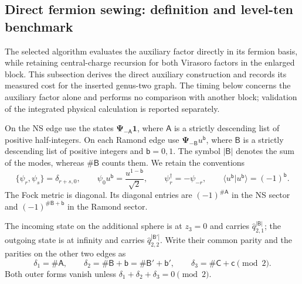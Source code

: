 \subsection{Direct fermion sewing: definition and level-ten benchmark}
\label{direct-fermion-definition}

The selected algorithm evaluates the auxiliary factor directly in its
fermion basis, while retaining central-charge recursion for both
Virasoro factors in the enlarged block.  This subsection derives the
direct auxiliary construction and records its measured cost for the
inserted genus-two graph.  The timing below concerns the auxiliary
factor alone and performs no comparison with another block; validation
of the integrated physical calculation is reported separately.

On the NS edge use the states
$\boldsymbol\Psi_{-\mathsf A}\mathbf1$, where $\mathsf A$ is a
strictly descending list of positive half-integers.  On each Ramond
edge use $\boldsymbol\Psi_{-\mathsf B}u^{\mathsf b}$, where
$\mathsf B$ is a strictly descending list of positive integers and
$\mathsf b=0,1$.  The symbol $|\mathsf B|$ denotes the sum of the
modes, whereas $\#\mathsf B$ counts them.  We retain the conventions
\begin{equation}
 \{\psi_r,\psi_s\}=\delta_{r+s,0},\qquad
 \psi_0u^{\mathsf b}=\frac{u^{1-\mathsf b}}{\sqrt2},\qquad
 \psi_r^\dagger=-\psi_{-r},\qquad
 \langle u^{\mathsf b}|u^{\mathsf b}\rangle=(-1)^{\mathsf b}.
\end{equation}
The Fock metric is diagonal.  Its diagonal entries are
$(-1)^{\#\mathsf A}$ in the NS sector and
$(-1)^{\#\mathsf B+\mathsf b}$ in the Ramond sector.

The incoming state on the additional sphere is at $z_3=0$ and carries
$\hat q_{2,1}^{|\mathsf B|}$; the outgoing state is at infinity and
carries $\hat q_{2,2}^{|\mathsf B'|}$.  Write their common parity and
the parities on the other two edges as
\begin{equation}
 \delta_1=\#\mathsf A,\qquad
 \delta_2=\#\mathsf B+\mathsf b
          =\#\mathsf B'+\mathsf b',\qquad
 \delta_3=\#\mathsf C+\mathsf c\pmod2.
\end{equation}
Both outer forms vanish unless
$\delta_1+\delta_2+\delta_3=0\pmod2$.


